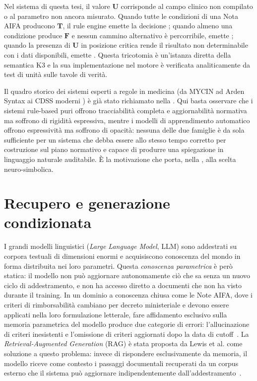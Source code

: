 Nel sistema di questa tesi, il valore $\mathbf{U}$ corrisponde al campo clinico
non compilato o al parametro non ancora misurato. Quando tutte le condizioni
di una Nota AIFA producono $\mathbf{T}$, il rule engine emette la decisione
; quando almeno una condizione produce $\mathbf{F}$
e nessun cammino alternativo è percorribile, emette ;
quando la presenza di $\mathbf{U}$ in posizione critica rende il risultato
non determinabile con i dati disponibili, emette .
Questa tricotomia è un'istanza diretta della semantica K3 e la sua
implementazione nel motore è verificata analiticamente da test di unità
sulle tavole di verità.

Il quadro storico dei sistemi esperti a regole in medicina (da MYCIN
\cite{shortliffe1974mycin} ad Arden Syntax \cite{hripcsak1994arden} ai CDSS
moderni \cite{greenes2007cdss,berner2007cdss,sutton2020overview}) è già
stato richiamato nella . Qui basta osservare che i
sistemi rule-based puri offrono tracciabilità completa e aggiornabilità
normativa ma soffrono di rigidità espressiva, mentre i modelli di
apprendimento automatico offrono espressività ma soffrono di opacità: nessuna
delle due famiglie è da sola sufficiente per un sistema che debba essere allo
stesso tempo corretto per costruzione sul piano normativo e capace di produrre
una spiegazione in linguaggio naturale auditabile. È la motivazione che porta,
nella , alla scelta neuro-simbolica.


\section{Recupero e generazione condizionata}
\label{sec:rag}

I grandi modelli linguistici (\emph{Large Language Model}, LLM) sono addestrati su corpora testuali di
dimensioni enormi e acquisiscono conoscenza del mondo in forma distribuita
nei loro parametri. Questa \emph{conoscenza parametrica} è però statica:
il modello non può aggiornare autonomamente ciò che sa senza un nuovo ciclo
di addestramento, e non ha accesso diretto a documenti che non ha visto
durante il training. In un dominio a conoscenza chiusa come le Note AIFA,
dove i criteri di rimborsabilità cambiano per decreto ministeriale e devono
essere applicati nella loro formulazione letterale, fare affidamento
esclusivo sulla memoria parametrica del modello produce due categorie di
errori: l'allucinazione di criteri inesistenti e l'omissione di criteri
aggiornati dopo la data di cutoff~\cite{ji2023hallucination}. La
\emph{Retrieval-Augmented Generation} (RAG) è stata proposta da Lewis et al.
come soluzione a questo problema: invece di rispondere esclusivamente da
memoria, il modello riceve come contesto i passaggi documentali recuperati
da un corpus esterno che il sistema può aggiornare indipendentemente
dall'addestramento~\cite{lewis2020rag}.

